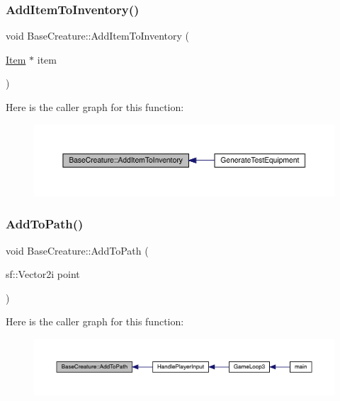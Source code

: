 \subsubsection{\texorpdfstring{Add\+Item\+To\+Inventory()}{AddItemToInventory()}}
{\footnotesize\ttfamily void Base\+Creature\+::\+Add\+Item\+To\+Inventory (\begin{DoxyParamCaption}\item[{\mbox{\hyperlink{class_item}{Item}} $\ast$}]{item }\end{DoxyParamCaption})}

Here is the caller graph for this function\+:
\nopagebreak
\begin{figure}[H]
\begin{center}
\leavevmode
\includegraphics[width=350pt]{d2/d3b/class_base_creature_ab6f0139afb4e1b15d5f1feecc267580d_icgraph}
\end{center}
\end{figure}
\mbox{\label{class_base_creature_aa18f395754df39095f993e6805ef37a8}} 
\subsubsection{\texorpdfstring{Add\+To\+Path()}{AddToPath()}}
{\footnotesize\ttfamily void Base\+Creature\+::\+Add\+To\+Path (\begin{DoxyParamCaption}\item[{sf\+::\+Vector2i}]{point }\end{DoxyParamCaption})}

Here is the caller graph for this function\+:
\nopagebreak
\begin{figure}[H]
\begin{center}
\leavevmode
\includegraphics[width=350pt]{d2/d3b/class_base_creature_aa18f395754df39095f993e6805ef37a8_icgraph}
\end{center}
\end{figure}
\mbox{\label{class_base_creature_ab0a90200835bc80c6db29e31f98d35e9}} 
